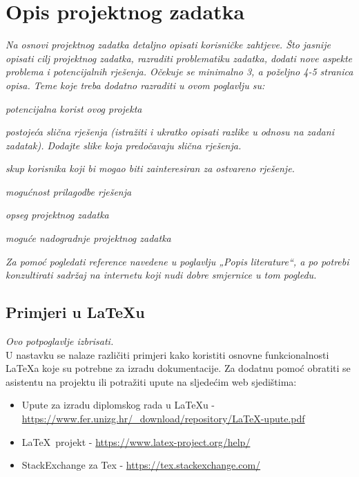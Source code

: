 \chapter{Opis projektnog zadatka}

\textit{Na osnovi projektnog zadatka detaljno opisati korisničke zahtjeve. Što jasnije opisati cilj projektnog zadatka, razraditi problematiku zadatka, dodati nove aspekte problema i potencijalnih rješenja. Očekuje se minimalno 3, a poželjno 4-5 stranica opisa.	Teme koje treba dodatno razraditi u ovom poglavlju su:}
\begin{packed_item}
	\item \textit{potencijalna korist ovog projekta}
	\item \textit{postojeća slična rješenja (istražiti i ukratko opisati razlike u odnosu na zadani zadatak). Dodajte slike koja predočavaju slična rješenja.}
	\item \textit{skup korisnika koji bi mogao biti zainteresiran za ostvareno rješenje.}
	\item \textit{mogućnost prilagodbe rješenja }
	\item \textit{opseg projektnog zadatka}
	\item \textit{moguće nadogradnje projektnog zadatka}
\end{packed_item}

\textit{Za pomoć pogledati reference navedene u poglavlju „Popis literature“, a po potrebi konzultirati sadržaj na internetu koji nudi dobre smjernice u tom pogledu.}
\eject

\section{Primjeri u \LaTeX u}

\textit{Ovo potpoglavlje izbrisati.}\\

U nastavku se nalaze različiti primjeri kako koristiti osnovne funkcionalnosti \LaTeX a koje su potrebne za izradu dokumentacije. Za dodatnu pomoć obratiti se asistentu na projektu ili potražiti upute na sljedećim web sjedištima:
\begin{itemize}
	\item Upute za izradu diplomskog rada u \LaTeX u - \url{https://www.fer.unizg.hr/_download/repository/LaTeX-upute.pdf}
	\item \LaTeX\ projekt - \url{https://www.latex-project.org/help/}
	\item StackExchange za Tex - \url{https://tex.stackexchange.com/}\\

\end{itemize}



